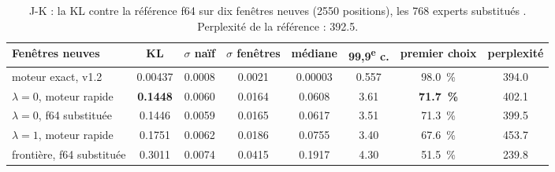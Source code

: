 \begin{table}[ht]
\centering\footnotesize
\caption[J-K : la KL sur les fenêtres neuves]{J-K : la KL contre la référence f64 sur dix fenêtres neuves (\num{2550} positions), les 768 experts substitués \mes. Perplexité de la référence : \num{392.5}.}
\label{t3jug:tab:jk}
\begin{tabular}{@{}lccccccc@{}}
\toprule
Fenêtres neuves & KL & $\sigma$ naïf & $\sigma$ fenêtres & médiane & 99,9\textsuperscript{e} c. & premier choix & perplexité \\
\midrule
moteur exact, v1.2 & \num{0.00437} & \num{0.0008} & \num{0.0021} & \num{0.00003} & \num{0.557} & \SI{98.0}{\percent} & \num{394.0} \\
$\lambda = 0$, moteur rapide & \textbf{\num{0.1448}} & \num{0.0060} & \num{0.0164} & \num{0.0608} & \num{3.61} & \textbf{\SI{71.7}{\percent}} & \num{402.1} \\
$\lambda = 0$, f64 substituée & \num{0.1446} & \num{0.0059} & \num{0.0165} & \num{0.0617} & \num{3.51} & \SI{71.3}{\percent} & \num{399.5} \\
$\lambda = 1$, moteur rapide & \num{0.1751} & \num{0.0062} & \num{0.0186} & \num{0.0755} & \num{3.40} & \SI{67.6}{\percent} & \num{453.7} \\
frontière, f64 substituée & \num{0.3011} & \num{0.0074} & \num{0.0415} & \num{0.1917} & \num{4.30} & \SI{51.5}{\percent} & \num{239.8} \\
\bottomrule
\end{tabular}
\end{table}

